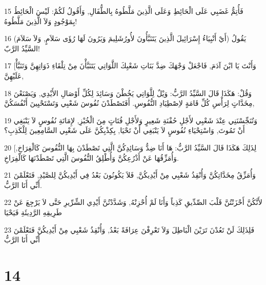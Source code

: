 \par 15 فَأُتِمُّ غَضَبِي عَلَى الْحَائِطِ وَعَلَى الَّذِينَ مَلَّطُوهُ بِالطُّفَالِ, وَأَقُولُ لَكُمْ: لَيْسَ الْحَائِطُ بِمَوْجُودٍ وَلاَ الَّذِينَ مَلَّطُوهُ!
\par 16 (أَيْ أَنْبِيَاءُ إِسْرَائِيلَ الَّذِينَ يَتَنَبَّأُونَ لأُورُشَلِيمَ وَيَرُونَ لَهَا رُؤَى سَلاَمٍ, وَلاَ سَلاَمَ) يَقُولُ السَّيِّدُ الرَّبّ!
\par 17 [وَأَنْتَ يَا ابْنَ آدَمَ, فَاجْعَلْ وَجْهَكَ ضِدَّ بَنَاتِ شَعْبِكَ اللَّوَاتِي يَتَنَبَّأْنَ مِنْ تِلْقَاءِ ذَوَاتِهِنَّ وَتَنَبَّأْ عَلَيْهِنَّ,
\par 18 وَقُلْ: هَكَذَا قَالَ السَّيِّدُ الرَّبُّ: وَيْلٌ لِلَّوَاتِي يَخُطْنَ وَسَائِدَ لِكُلِّ أَوْصَالِ الأَيْدِي, وَيَصْنَعْنَ مِخَدَّاتٍ لِرَأْسِ كُلِّ قَامَةٍ لاِصْطِيَادِ النُّفُوسِ. أَفَتَصْطَدْنَ نُفُوسَ شَعْبِي وَتَسْتَحْيِينَ أَنْفُسَكُنَّ,
\par 19 وَتُنَجِّسْنَنِي عِنْدَ شَعْبِي لأَجْلِ حُفْنَةِ شَعِيرٍ وَلأَجْلِ فُتَاتٍ مِنَ الْخُبْزِ, لإِمَاتَةِ نُفُوسٍ لاَ يَنْبَغِي أَنْ تَمُوتَ, وَاسْتِحْيَاءِ نُفُوسٍ لاَ يَنْبَغِي أَنْ تَحْيَا, بِكِذْبِكُنَّ عَلَى شَعْبِي السَّامِعِينَ لِلْكَذِبِ؟
\par 20 [لِذَلِكَ هَكَذَا قَالَ السَّيِّدُ الرَّبُّ: هَا أَنَا ضِدُّ وَسَائِدِكُنَّ الَّتِي تَصْطَدْنَ بِهَا النُّفُوسَ كَالْفِرَاخِ, وَأُمَزِّقُهَا عَنْ أَذْرُعِكُنَّ وَأُطْلِقُ النُّفُوسَ الَّتِي تَصْطَدْنَهَا كَالْفِرَاخِ.
\par 21 وَأُمَزِّقُ مِخَدَّاتِكُنَّ وَأُنْقِذُ شَعْبِي مِنْ أَيْدِيكُنَّ, فَلاَ يَكُونُونَ بَعْدُ فِي أَيْدِيكُنَّ لِلصَّيْدِ, فَتَعْلَمْنَ أَنِّي أَنَا الرَّبُّ.
\par 22 لأَنَّكُنَّ أَحْزَنْتُنَّ قَلْبَ الصِّدِّيقِ كَذِباً وَأَنَا لَمْ أُحْزِنْهُ, وَشَدَّدْتُنَّ أَيْدِي الشِّرِّيرِ حَتَّى لاَ يَرْجِعَ عَنْ طَرِيقِهِ الرَّدِيئَةِ فَيَحْيَا
\par 23 فَلِذَلِكَ لَنْ تَعُدْنَ تَرَيْنَ الْبَاطِلَ وَلاَ تَعْرِفْنَ عِرَافَةً بَعْدُ, وَأُنْقِذُ شَعْبِي مِنْ أَيْدِيكُنَّ فَتَعْلَمْنَ أَنِّي أَنَا الرَّبُّ

\chapter{14}

